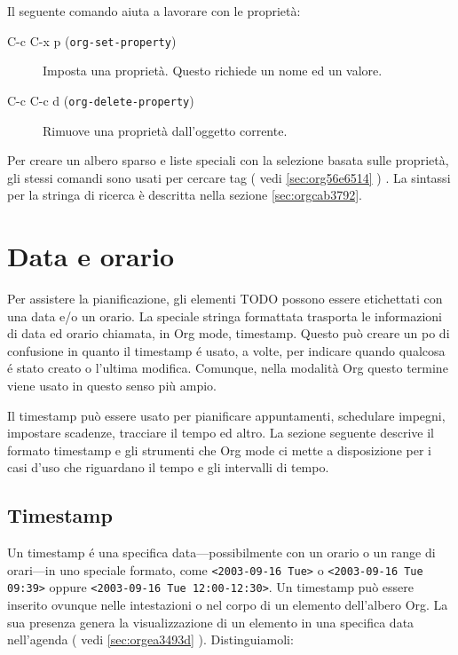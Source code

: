 \documentclass[11pt]{article}
\begin{document}
Il seguente comando aiuta a lavorare con le proprietà:

\begin{description}
\item[{C-c C-x p (\texttt{org-set-property})}] Imposta una proprietà. Questo richiede un nome ed un valore.

\item[{C-c C-c d (\texttt{org-delete-property})}] Rimuove una proprietà dall'oggetto corrente.
\end{description}

Per creare un albero sparso e liste speciali con la selezione basata
sulle proprietà, gli stessi comandi sono usati per cercare tag ( vedi
\ref{sec:org56e6514} ) . La sintassi per la stringa di ricerca è descritta nella
sezione \ref{sec:orgcab3792}.

\section{Data e orario}
\label{sec:org1c5e9f6}
Per assistere la pianificazione, gli elementi TODO possono essere
etichettati con una data e/o un orario. La speciale stringa formattata
trasporta le informazioni di data ed orario chiamata, in Org mode,
timestamp. Questo può creare un po di confusione in quanto il
timestamp é usato, a volte, per indicare quando qualcosa é stato
creato o l'ultima modifica. Comunque, nella modalità Org questo
termine viene usato in questo senso più ampio.

Il timestamp può essere usato per pianificare appuntamenti, schedulare
impegni, impostare scadenze, tracciare il tempo ed altro. La sezione
seguente descrive il formato timestamp e gli strumenti che Org mode ci
mette a disposizione per i casi d'uso che riguardano il tempo e gli
intervalli di tempo.

\subsection{Timestamp}
\label{sec:org78352b1}
Un timestamp é una specifica data---possibilmente con un orario o un
range di orari---in uno speciale formato, come \texttt{<2003-09-16 Tue>} o
\texttt{<2003-09-16 Tue 09:39>} oppure \texttt{<2003-09-16 Tue 12:00-12:30>}.
Un timestamp può essere inserito ovunque nelle intestazioni o nel corpo di un
elemento dell'albero Org. La sua presenza genera la visualizzazione di
un elemento in una specifica data nell'agenda ( vedi \ref{sec:orgea3493d} ). Distinguiamoli:
\end{document}
